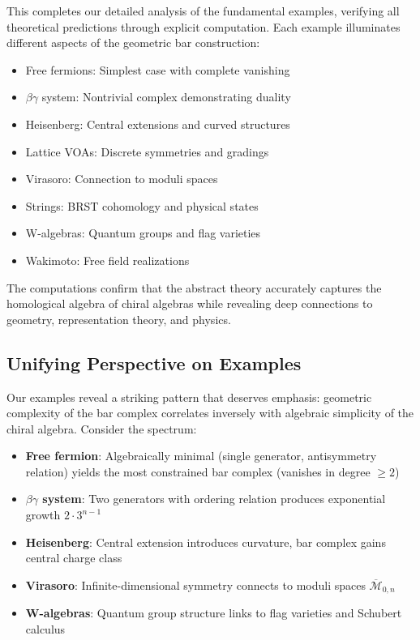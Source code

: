 This completes our detailed analysis of the fundamental examples, verifying all theoretical predictions 
through explicit computation. Each example illuminates different aspects of the geometric bar construction:
\begin{itemize}
\item Free fermions: Simplest case with complete vanishing
\item $\beta\gamma$ system: Nontrivial complex demonstrating duality
\item Heisenberg: Central extensions and curved structures
\item Lattice VOAs: Discrete symmetries and gradings
\item Virasoro: Connection to moduli spaces
\item Strings: BRST cohomology and physical states
\item W-algebras: Quantum groups and flag varieties
\item Wakimoto: Free field realizations
\end{itemize}
 
The computations confirm that the abstract theory accurately captures the homological algebra of chiral 
algebras while revealing deep connections to geometry, representation theory, and physics.
\subsection{Unifying Perspective on Examples}

Our examples reveal a striking pattern that deserves emphasis: geometric complexity of the bar complex correlates inversely with algebraic simplicity of the chiral algebra. Consider the spectrum:

\begin{itemize}
\item \textbf{Free fermion}: Algebraically minimal (single generator, antisymmetry relation) yields the most constrained bar complex (vanishes in degree $\geq 2$)
\item \textbf{$\beta\gamma$ system}: Two generators with ordering relation produces exponential growth $2 \cdot 3^{n-1}$
\item \textbf{Heisenberg}: Central extension introduces curvature, bar complex gains central charge class
\item \textbf{Virasoro}: Infinite-dimensional symmetry connects to moduli spaces $\overline{\mathcal{M}}_{0,n}$
\item \textbf{W-algebras}: Quantum group structure links to flag varieties and Schubert calculus
\end{itemize}


